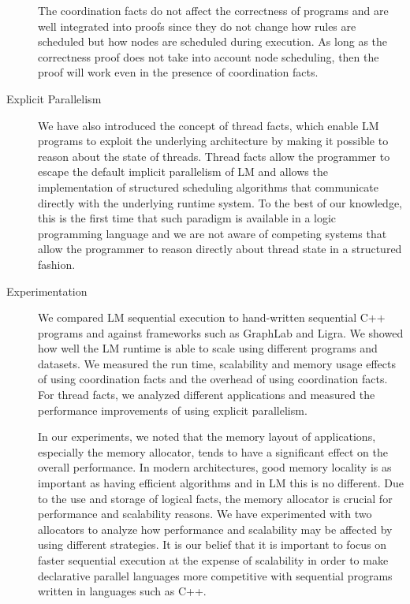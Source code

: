 \begin{description}
The coordination facts do not affect the correctness of programs and are well
integrated into proofs since they do not change how rules are scheduled but how
nodes are scheduled during execution. As long as the correctness proof does not
take into account node scheduling, then the proof will work even in the presence
of coordination facts.

\item[Explicit Parallelism]

We have also introduced the concept of thread facts, which enable LM programs to
exploit the underlying architecture by making it possible to reason about the
state of threads. Thread facts allow the programmer to escape the default
implicit parallelism of LM and allows the implementation of structured
scheduling algorithms that communicate directly with the underlying runtime
system. To the best of our knowledge, this is the first time that such paradigm
is available in a logic programming language and we are not aware of competing
systems that allow the programmer to reason directly about thread state in a
structured fashion.

\item[Experimentation]

We compared LM sequential execution to hand-written sequential C++ programs and
against frameworks such as GraphLab and Ligra. We showed how well the LM runtime
is able to scale using different programs and datasets. We measured the run
time, scalability and memory usage effects of using coordination facts and the
overhead of using coordination facts. For thread facts, we analyzed different
applications and measured the performance improvements of using explicit
parallelism.

In our experiments, we noted that the memory layout of applications, especially
the memory allocator, tends to have a significant effect on the overall
performance. In modern architectures, good memory locality is as important as
having efficient algorithms and in LM this is no different. Due to the use and
storage of logical facts, the memory allocator is crucial for performance and
scalability reasons. We have experimented with two allocators to analyze how
performance and scalability may be affected by using different strategies. It is
our belief that it is important to focus on faster sequential execution at the
expense of scalability in order to make declarative parallel languages more
competitive with sequential programs written in languages such as C++.

\end{description}

